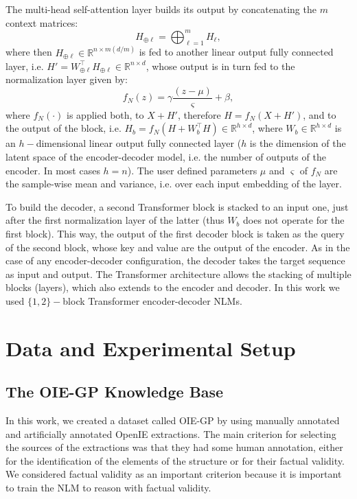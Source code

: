 \documentclass[preprint]{elsarticle}
\begin{document}
The multi-head self-attention layer builds its output by concatenating the $m$ context matrices:
$$H_{\oplus \ell}=\bigoplus_{\ell = 1}^m H_{\ell},$$
\noindent where then $H_{\oplus \ell}\in\mathbb{R}^{n\times m(d/m)}$ is fed to another linear output fully connected layer, i.e. $H'=W_{\oplus \ell}^\top H_{\oplus \ell}\in\mathbb{R}^{n\times d}$, whose output is in turn fed to the normalization layer given by:
$$f_N(z)=\gamma\frac{(z-\mu)}{\varsigma}+\beta,$$
\noindent where $f_N(\cdot)$ is applied both, to $X+H'$, therefore $H=f_N(X+H')$, and to the output of the block, i.e.  $H_b=f_N(H + W_b^\top H)\in\mathbb{R}^{h\times d}$, where $W_b\in\mathbb{R}^{h\times d}$ is an $h-$dimensional linear output fully connected layer ($h$ is the dimension of the latent space of the encoder-decoder model, i.e. the number of outputs of the encoder. In most cases $h=n$). The user defined parameters $\mu$ and $\varsigma$ of $f_N$ are the sample-wise mean and variance, i.e. over each input embedding of the layer.

To build the decoder, a second Transformer block is stacked to an input one, just after the first normalization layer of the latter (thus $W_b$ does not operate for the first block). This way, the output of the first decoder block is taken as the query of the second block, whose key and value are the output of the encoder. As in the case of any encoder-decoder configuration, the decoder takes the target sequence as input and output. The Transformer architecture allows the stacking of multiple blocks (layers), which also extends to the encoder and decoder. In this work we used $\{1,2\}-$block Transformer encoder-decoder NLMs.



\section{Data and Experimental Setup}\label{sec:05_data_and_experimental_setup}

\subsection{The OIE-GP Knowledge Base}\label{sec:oie_gp_data}
In this work, we created a dataset called OIE-GP by using manually annotated and artificially annotated OpenIE extractions. The main criterion for selecting the sources of the extractions was that they had some human annotation, either for the identification of the elements of the structure or for their factual validity. We considered factual validity as an important criterion because it is important to train the NLM to reason with factual validity. 
\end{document}
